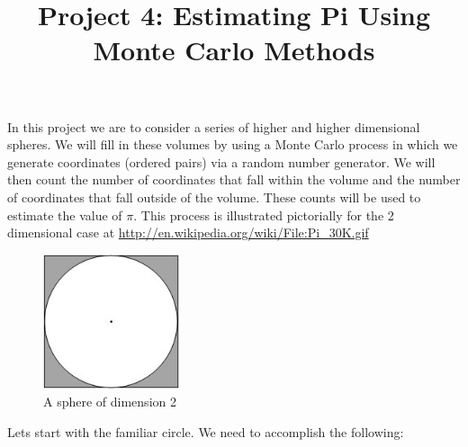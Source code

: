 \documentclass[11pt]{amsart}
\title{Project 4: Estimating Pi Using Monte Carlo Methods}
\begin{document}
\maketitle

In this project we are to consider a series of higher and higher dimensional spheres.  We will fill in these volumes by using a Monte Carlo process in which we generate coordinates (ordered pairs) via a random number generator.  We will then count the number of coordinates that fall within the volume and the number of coordinates that fall outside of the volume.  These counts will be used to estimate the value of $\pi$.  This process is illustrated pictorially for the 2 dimensional case at \url{http://en.wikipedia.org/wiki/File:Pi_30K.gif}
\newline

\begin{figure}[ht!]
\centering
\includegraphics[width=40mm]{circle.jpg}
\caption{A sphere of dimension 2}
\label{overflow}
\end{figure}

Lets start with the familiar circle.  We need to accomplish the following:
\end{document}
